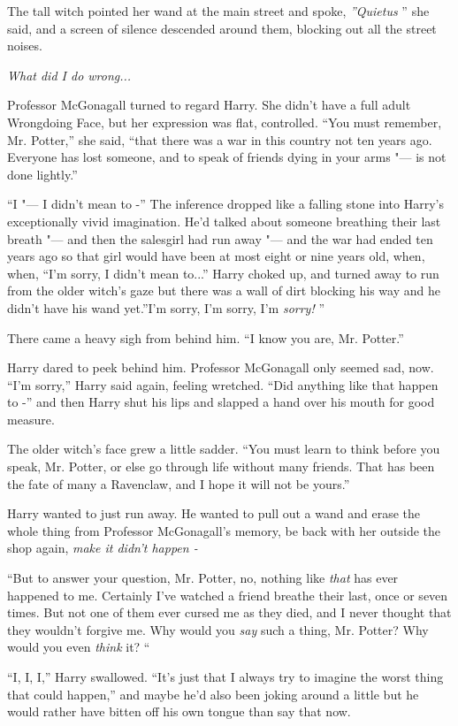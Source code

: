 The tall witch pointed her wand at the main street and spoke,
\emph{''Quietus} '' she said, and a screen of silence descended around
them, blocking out all the street noises.

\emph{What did I do wrong...}

Professor McGonagall turned to regard Harry. She didn't have a full
adult Wrongdoing Face, but her expression was flat, controlled. ``You
must remember, Mr. Potter,'' she said, ``that there was a war in this
country not ten years ago. Everyone has lost someone, and to speak of
friends dying in your arms "--- is not done lightly.''

``I "--- I didn't mean to -'' The inference dropped like a falling stone
into Harry's exceptionally vivid imagination. He'd talked about someone
breathing their last breath "--- and then the salesgirl had run away "--- and
the war had ended ten years ago so that girl would have been at most
eight or nine years old, when, when, ``I'm sorry, I didn't mean
to...'' Harry choked up, and turned away to run from the older
witch's gaze but there was a wall of dirt blocking his way and he didn't
have his wand yet.''I'm sorry, I'm sorry, I'm \emph{sorry!} ''

There came a heavy sigh from behind him. ``I know you are, Mr. Potter.''

Harry dared to peek behind him. Professor McGonagall only seemed sad,
now. ``I'm sorry,'' Harry said again, feeling wretched. ``Did anything
like that happen to -'' and then Harry shut his lips and slapped a hand
over his mouth for good measure.

The older witch's face grew a little sadder. ``You must learn to think
before you speak, Mr. Potter, or else go through life without many
friends. That has been the fate of many a Ravenclaw, and I hope it will
not be yours.''

Harry wanted to just run away. He wanted to pull out a wand and erase
the whole thing from Professor McGonagall's memory, be back with her
outside the shop again, \emph{make it didn't happen -}

``But to answer your question, Mr. Potter, no, nothing like \emph{that}
has ever happened to me. Certainly I've watched a friend breathe their
last, once or seven times. But not one of them ever cursed me as they
died, and I never thought that they wouldn't forgive me. Why would you
\emph{say} such a thing, Mr. Potter? Why would you even \emph{think} it?
``

``I, I, I,'' Harry swallowed. ``It's just that I always try to imagine
the worst thing that could happen,'' and maybe he'd also been joking
around a little but he would rather have bitten off his own tongue than
say that now.

